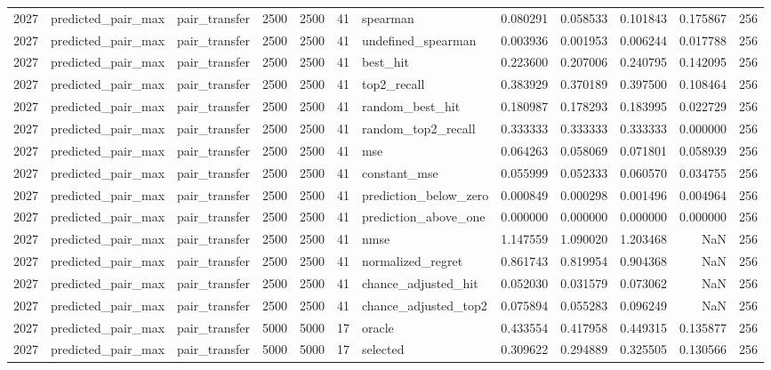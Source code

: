 \begin{tabular}{rllrrrlrrrrr}
2027 & predicted_pair_max & pair_transfer & 2500 & 2500 & 41 & spearman & 0.080291 & 0.058533 & 0.101843 & 0.175867 & 256 \\
2027 & predicted_pair_max & pair_transfer & 2500 & 2500 & 41 & undefined_spearman & 0.003936 & 0.001953 & 0.006244 & 0.017788 & 256 \\
2027 & predicted_pair_max & pair_transfer & 2500 & 2500 & 41 & best_hit & 0.223600 & 0.207006 & 0.240795 & 0.142095 & 256 \\
2027 & predicted_pair_max & pair_transfer & 2500 & 2500 & 41 & top2_recall & 0.383929 & 0.370189 & 0.397500 & 0.108464 & 256 \\
2027 & predicted_pair_max & pair_transfer & 2500 & 2500 & 41 & random_best_hit & 0.180987 & 0.178293 & 0.183995 & 0.022729 & 256 \\
2027 & predicted_pair_max & pair_transfer & 2500 & 2500 & 41 & random_top2_recall & 0.333333 & 0.333333 & 0.333333 & 0.000000 & 256 \\
2027 & predicted_pair_max & pair_transfer & 2500 & 2500 & 41 & mse & 0.064263 & 0.058069 & 0.071801 & 0.058939 & 256 \\
2027 & predicted_pair_max & pair_transfer & 2500 & 2500 & 41 & constant_mse & 0.055999 & 0.052333 & 0.060570 & 0.034755 & 256 \\
2027 & predicted_pair_max & pair_transfer & 2500 & 2500 & 41 & prediction_below_zero & 0.000849 & 0.000298 & 0.001496 & 0.004964 & 256 \\
2027 & predicted_pair_max & pair_transfer & 2500 & 2500 & 41 & prediction_above_one & 0.000000 & 0.000000 & 0.000000 & 0.000000 & 256 \\
2027 & predicted_pair_max & pair_transfer & 2500 & 2500 & 41 & nmse & 1.147559 & 1.090020 & 1.203468 & NaN & 256 \\
2027 & predicted_pair_max & pair_transfer & 2500 & 2500 & 41 & normalized_regret & 0.861743 & 0.819954 & 0.904368 & NaN & 256 \\
2027 & predicted_pair_max & pair_transfer & 2500 & 2500 & 41 & chance_adjusted_hit & 0.052030 & 0.031579 & 0.073062 & NaN & 256 \\
2027 & predicted_pair_max & pair_transfer & 2500 & 2500 & 41 & chance_adjusted_top2 & 0.075894 & 0.055283 & 0.096249 & NaN & 256 \\
2027 & predicted_pair_max & pair_transfer & 5000 & 5000 & 17 & oracle & 0.433554 & 0.417958 & 0.449315 & 0.135877 & 256 \\
2027 & predicted_pair_max & pair_transfer & 5000 & 5000 & 17 & selected & 0.309622 & 0.294889 & 0.325505 & 0.130566 & 256 \\

\end{tabular}
